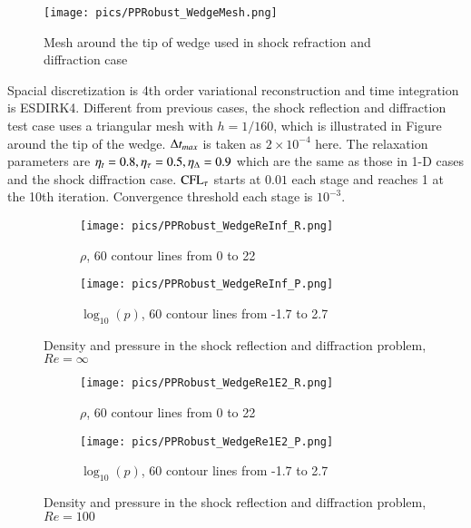\documentclass[preprint,12pt]{elsarticle}
\begin{document}
\begin{figure}[htbp]
    \centering
    \texttt{[image: pics/PPRobust\_WedgeMesh.png]}
    \caption{Mesh around the tip of wedge used in shock refraction and diffraction case}
    \label{fig:wedgeMesh}
\end{figure}

Spacial discretization is 4th order variational reconstruction and 
time integration is ESDIRK4. 
Different from previous cases,
the shock reflection and diffraction test case uses a triangular mesh with $h = 1/160$,
which is illustrated in Figure around the tip of the wedge.
$\mathrm\Delta t_{max}$ is taken as $2\times10^{-4}$ here.
The relaxation parameters are $\eta_t= 0.8, \eta_\tau=0.5, \eta_\mathrm\Delta=0.9$
which are the same as those in 1-D cases and the shock diffraction case.
$\text{CFL}_\tau$ starts at $0.01$ each stage and reaches 1 at the 10th iteration.
Convergence threshold each stage is $10^{-3}$. 

\begin{figure}[htbp]
    \centering
    \begin{subfigure}{0.5\textwidth}
        \texttt{[image: pics/PPRobust\_WedgeReInf\_R.png]}
        \caption[]{$\rho$, 60 contour lines from 0 to 22}
    \end{subfigure}\hfill
    \begin{subfigure}{0.5\textwidth}
        \texttt{[image: pics/PPRobust\_WedgeReInf\_P.png]}
        \caption[]{$\log_{10}(p)$, 60 contour lines from -1.7 to 2.7}
    \end{subfigure}
    \caption{Density and pressure in the shock reflection and diffraction problem, $Re=\infty$}
    \label{fig:wedgeReInf}
\end{figure}

\begin{figure}[htbp]
    \centering
    \begin{subfigure}{0.5\textwidth}
        \texttt{[image: pics/PPRobust\_WedgeRe1E2\_R.png]}
        \caption[]{$\rho$, 60 contour lines from 0 to 22}
    \end{subfigure}\hfill
    \begin{subfigure}{0.5\textwidth}
        \texttt{[image: pics/PPRobust\_WedgeRe1E2\_P.png]}
        \caption[]{$\log_{10}(p)$, 60 contour lines from -1.7 to 2.7}
    \end{subfigure}
    \caption{Density and pressure in the shock reflection and diffraction problem, $Re=100$}
    \label{fig:wedgeRe1E2}
\end{figure}
\end{document}
